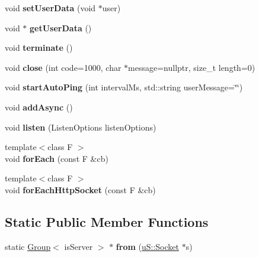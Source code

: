 \begin{DoxyCompactItemize}
\item 
\mbox{\label{structu_w_s_1_1_group_a6d2a20258ddf24c8dfee5e4bd9d8d9f1}} 
void {\bfseries set\+User\+Data} (void $\ast$user)
\item 
\mbox{\label{structu_w_s_1_1_group_a107e3c05fbd4ca941bb8d46cddd3d0ae}} 
void $\ast$ {\bfseries get\+User\+Data} ()
\item 
\mbox{\label{structu_w_s_1_1_group_ac407ed1e811640bf5e4c6afe21e6393b}} 
void {\bfseries terminate} ()
\item 
\mbox{\label{structu_w_s_1_1_group_a6a89a4f459f007ddf7f1653fa3ec621d}} 
void {\bfseries close} (int code=1000, char $\ast$message=nullptr, size\+\_\+t length=0)
\item 
\mbox{\label{structu_w_s_1_1_group_a3621e3f62872bcc925622528dd261be3}} 
void {\bfseries start\+Auto\+Ping} (int interval\+Ms, std\+::string user\+Message=\char`\"{}\char`\"{})
\item 
\mbox{\label{structu_w_s_1_1_group_a9d2501ab35e2a7dd9dfa2e000fa4275d}} 
void {\bfseries add\+Async} ()
\item 
\mbox{\label{structu_w_s_1_1_group_afc2f287e5a2129ce5fa456a1d35037ee}} 
void {\bfseries listen} (Listen\+Options listen\+Options)
\item 
\mbox{\label{structu_w_s_1_1_group_a275f69774585def1dbff702b2974d21a}} 
{\footnotesize template$<$class F $>$ }\\void {\bfseries for\+Each} (const F \&cb)
\item 
\mbox{\label{structu_w_s_1_1_group_a7dac60bd7089a7ebaf131097c7bd8d7c}} 
{\footnotesize template$<$class F $>$ }\\void {\bfseries for\+Each\+Http\+Socket} (const F \&cb)
\end{DoxyCompactItemize}
\subsection*{Static Public Member Functions}
\begin{DoxyCompactItemize}
\item 
\mbox{\label{structu_w_s_1_1_group_af62bcd74f6b06f989f9121c4ca55375c}} 
static \mbox{\hyperlink{structu_w_s_1_1_group}{Group}}$<$ is\+Server $>$ $\ast$ {\bfseries from} (\mbox{\hyperlink{structu_s_1_1_socket}{u\+S\+::\+Socket}} $\ast$s)
\end{DoxyCompactItemize}
